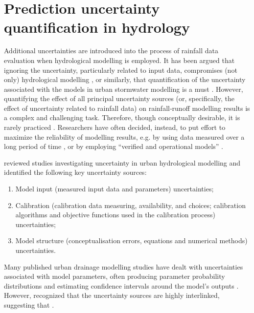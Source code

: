 \documentclass{ctuthesis}\usepackage[]{graphicx}\usepackage[]{color}
\begin{document}
\section{Prediction uncertainty quantification in hydrology} \label{PredUncQuant}

Additional uncertainties are introduced into the process of rainfall data evaluation when hydrological modelling is employed. It has been argued that ignoring the uncertainty, particularly related to input data, compromises (not only) hydrological modelling \citep{beven2006undermining, kavetskiBayesianAnalysisInput2006}, or similarly, that quantification of the uncertainty associated with the models in urban stormwater modelling is a must \citep{dotto2012comparison}. However, quantifying the effect of all principal uncertainty sources (or, specifically, the effect of
uncertainty related to rainfall data) on rainfall‐runoff modelling results is a complex and challenging
task. Therefore, though conceptually desirable, it is rarely practiced \citep{dotto2012comparison}. Researchers have often decided, instead, to put effort to maximize the reliability of modelling results, e.g. by using data measured over a long period of time \citep{segondSignificanceSpatialRainfall2007}, or by employing “verified and operational models” \citep{ochoa-rodriguezImpactSpatialTemporal2015}.

\cite{deleticAssessingUncertaintiesUrban2012} reviewed studies investigating uncertainty in urban hydrological modelling and identified the following key uncertainty sources:
\begin{enumerate}
        \item Model input (measured input data and parameters) uncertainties;
        \item Calibration (calibration data measuring, availability, and choices; calibration algorithms and objective functions used in the calibration process) uncertainties;
        \item Model structure (conceptualisation errors, equations and numerical methods) uncertainties. 
\end{enumerate}

Many published urban drainage modelling studies have dealt with uncertainties associated with model parameters, often producing parameter probability distributions and estimating confidence intervals around the model’s outputs \citep[e.g.][]{thorndahlEventBasedUncertainty2008, dotto2012comparison}. However, \cite{deleticAssessingUncertaintiesUrban2012} recognized that the uncertainty sources are highly interlinked, suggesting that .
\end{document}
